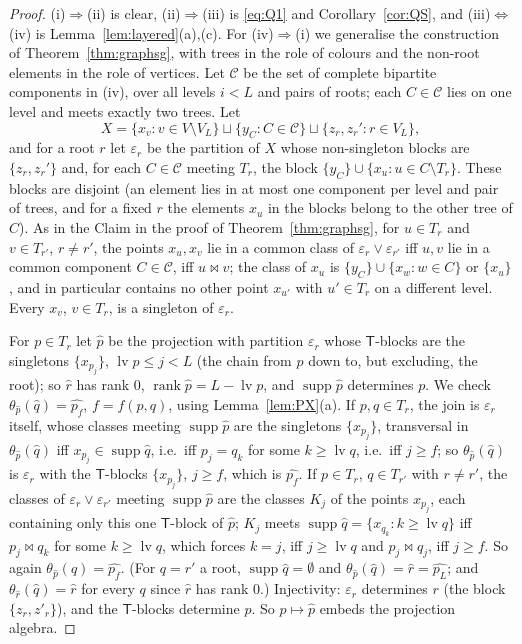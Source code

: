 \documentclass[11pt]{amsart}
\theoremstyle{definition}
\newcommand{\supp}{\operatorname{supp}}
\newcommand{\T}{\mathsf{T}}
\newcommand{\rk}{\operatorname{rank}}
\newcommand{\mt}{\bowtie}      %
\begin{document}
\begin{proof}
(i)$\Rightarrow$(ii) is clear, (ii)$\Rightarrow$(iii) is \eqref{eq:Q1} and Corollary~\ref{cor:QS}, and (iii)$\Leftrightarrow$(iv) is Lemma~\ref{lem:layered}(a),(c). For (iv)$\Rightarrow$(i) we generalise the construction of Theorem~\ref{thm:graphsg}, with trees in the role of colours and the non-root elements in the role of vertices. Let $\mathcal C$ be the set of complete bipartite components in (iv), over all levels $i<L$ and pairs of roots; each $C\in\mathcal C$ lies on one level and meets exactly two trees. Let
\[
X=\{x_v: v\in V\setminus V_L\}\sqcup\{y_C:C\in\mathcal C\}\sqcup\{z_r,z_r': r\in V_L\},
\]
and for a root $r$ let $\varepsilon_r$ be the partition of $X$ whose non-singleton blocks are $\{z_r,z_r'\}$ and, for each $C\in\mathcal C$ meeting $T_r$, the block $\{y_C\}\cup\{x_u: u\in C\setminus T_r\}$. These blocks are disjoint (an element lies in at most one component per level and pair of trees, and for a fixed $r$ the elements $x_u$ in the blocks belong to the other tree of $C$). As in the Claim in the proof of Theorem~\ref{thm:graphsg}, for $u\in T_r$ and $v\in T_{r'}$, $r\ne r'$, the points $x_u,x_v$ lie in a common class of $\varepsilon_r\vee\varepsilon_{r'}$ iff $u,v$ lie in a common component $C\in\mathcal C$, iff $u\mt v$; the class of $x_u$ is $\{y_C\}\cup\{x_w:w\in C\}$ or $\{x_u\}$, and in particular contains no other point $x_{u'}$ with $u'\in T_r$ on a different level. Every $x_v$, $v\in T_r$, is a singleton of $\varepsilon_r$.

For $p\in T_r$ let $\hat p$ be the projection with partition $\varepsilon_r$ whose $\T$-blocks are the singletons $\{x_{p_j}\}$, $\operatorname{lv}p\le j<L$ (the chain from $p$ down to, but excluding, the root); so $\hat r$ has rank $0$, $\rk\hat p=L-\operatorname{lv}p$, and $\supp\hat p$ determines $p$. We check $\theta_{\hat p}(\hat q)=\widehat{p_f}$, $f=f(p,q)$, using Lemma~\ref{lem:PX}(a). If $p,q\in T_r$, the join is $\varepsilon_r$ itself, whose classes meeting $\supp\hat p$ are the singletons $\{x_{p_j}\}$, transversal in $\theta_{\hat p}(\hat q)$ iff $x_{p_j}\in\supp\hat q$, i.e.\ iff $p_j=q_k$ for some $k\ge\operatorname{lv}q$, i.e.\ iff $j\ge f$; so $\theta_{\hat p}(\hat q)$ is $\varepsilon_r$ with the $\T$-blocks $\{x_{p_j}\}$, $j\ge f$, which is $\widehat{p_f}$. If $p\in T_r$, $q\in T_{r'}$ with $r\ne r'$, the classes of $\varepsilon_r\vee\varepsilon_{r'}$ meeting $\supp\hat p$ are the classes $K_j$ of the points $x_{p_j}$, each containing only this one $\T$-block of $\hat p$; $K_j$ meets $\supp\hat q=\{x_{q_k}:k\ge\operatorname{lv}q\}$ iff $p_j\mt q_k$ for some $k\ge\operatorname{lv}q$, which forces $k=j$, iff $j\ge\operatorname{lv}q$ and $p_j\mt q_j$, iff $j\ge f$. So again $\theta_{\hat p}(\hat q)=\widehat{p_f}$. (For $q=r'$ a root, $\supp\hat q=\emptyset$ and $\theta_{\hat p}(\hat q)=\hat r=\widehat{p_L}$; and $\theta_{\hat r}(\hat q)=\hat r$ for every $q$ since $\hat r$ has rank $0$.) Injectivity: $\varepsilon_r$ determines $r$ (the block $\{z_r,z'_r\}$), and the $\T$-blocks determine $p$. So $p\mapsto\hat p$ embeds the projection algebra.


\end{proof}
\end{document}
